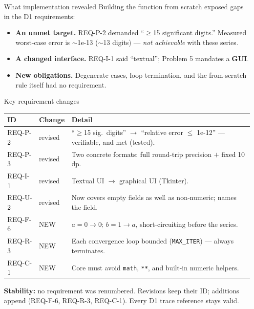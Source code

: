 \documentclass[10pt,aspectratio=169]{beamer}
\begin{document}
\begin{frame}{What implementation revealed}
  \small
  Building the function from scratch exposed gaps in the D1 requirements:
  \vspace{0.5em}
  \begin{itemize}\setlength\itemsep{0.4em}
    \item \textbf{An unmet target.} REQ-P-2 demanded ``$\ge$15 significant digits.'' Measured worst-case error is $\sim$1e-13 (\textcolor{mAccent}{$\sim$13 digits}) --- \emph{not achievable} with these series.
    \item \textbf{A changed interface.} REQ-I-1 said ``textual''; Problem 5 mandates a \textbf{GUI}.
    \item \textbf{New obligations.} Degenerate cases, loop termination, and the from-scratch rule itself had no requirement.
  \end{itemize}
\end{frame}

\begin{frame}{Key requirement changes}
  \scriptsize
  \renewcommand{\arraystretch}{1.3}
  \begin{tabular}{@{}>{\ttfamily}p{1.5cm} p{1.5cm} >{\raggedright\arraybackslash}p{8.6cm}@{}}
    \toprule
    \normalfont\textbf{ID} & \textbf{Change} & \textbf{Detail} \\
    \midrule
    REQ-P-2 & \textcolor{mAccent}{revised} & ``$\ge$15 sig.\ digits'' $\rightarrow$ ``relative error $\le$ 1e-12'' --- verifiable, and met (tested). \\
    REQ-P-3 & \textcolor{mAccent}{revised} & Two concrete formats: full round-trip precision $+$ fixed 10 dp. \\
    REQ-I-1 & \textcolor{mAccent}{revised} & Textual UI $\rightarrow$ graphical UI (Tkinter). \\
    REQ-U-2 & \textcolor{mAccent}{revised} & Now covers empty fields as well as non-numeric; names the field. \\
    REQ-F-6 & \textcolor{green!50!black}{NEW} & $a{=}0\to0$; $b{=}1\to a$, short-circuiting before the series. \\
    REQ-R-3 & \textcolor{green!50!black}{NEW} & Each convergence loop bounded (\texttt{MAX\_ITER}) --- always terminates. \\
    REQ-C-1 & \textcolor{green!50!black}{NEW} & Core must avoid \texttt{math}, \texttt{**}, and built-in numeric helpers. \\
    \bottomrule
  \end{tabular}
  \vspace{0.5em}

  \footnotesize\textbf{Stability:} no requirement was renumbered. Revisions keep their ID; additions append (REQ-F-6, REQ-R-3, REQ-C-1). Every D1 trace reference stays valid.
\end{frame}
\end{document}
